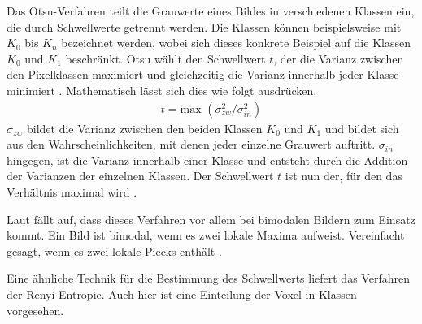Das Otsu-Verfahren teilt die Grauwerte eines Bildes in verschiedenen Klassen ein,
die durch Schwellwerte getrennt werden. Die Klassen können beispielsweise mit $K_{0}$
bis $K_{n}$ bezeichnet werden, wobei sich dieses konkrete Beispiel auf die
Klassen $K_{0}$ und $K_{1}$ beschränkt. Otsu wählt den Schwellwert $t$, der die
Varianz zwischen den Pixelklassen maximiert und gleichzeitig die Varianz
innerhalb jeder Klasse minimiert \citep[vgl.][S.~264]{lehmann2013bildverarbeitung}.
Mathematisch lässt sich dies wie folgt ausdrücken.
\begin{align}
	t = \text{max }(\sigma_{zw}^{2}/ \sigma_{in}^{2})
\end{align}
$\sigma_{zw}$ bildet die Varianz zwischen den beiden Klassen $K_{0}$ und $K_{1}$
und bildet sich aus den Wahrscheinlichkeiten, mit denen jeder einzelne Grauwert
auftritt. $\sigma_{in}$ hingegen, ist die Varianz innerhalb einer Klasse und
entsteht durch die Addition der Varianzen der einzelnen Klassen. Der Schwellwert
$t$ ist nun der, für den das Verhältnis maximal wird \citep[vgl.][S.~264]{lehmann2013bildverarbeitung}.

Laut \citet[S.~264]{lehmann2013bildverarbeitung} fällt auf, dass dieses Verfahren
vor allem bei bimodalen Bildern zum Einsatz kommt. Ein Bild ist bimodal, wenn es
zwei lokale Maxima aufweist. Vereinfacht gesagt, wenn es zwei lokale Piecks enthält
\citep[vgl.][S.~264]{lehmann2013bildverarbeitung}.

Eine ähnliche Technik für die Bestimmung des Schwellwerts liefert das Verfahren
der Renyi Entropie. Auch hier ist eine Einteilung der Voxel in Klassen vorgesehen.

\pagebreak

